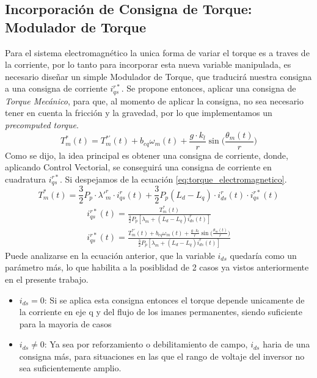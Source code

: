 \documentclass[12pt, a4paper,journal, onecolumn, compsoc]{IEEEtran}
\begin{document}
\subsection{Incorporación de Consigna de Torque: Modulador de Torque}
Para el sistema electromagnético la unica forma de variar el torque es a traves de la corriente, por lo tanto para incorporar esta nueva variable manipulada, es necesario diseñar un simple Modulador de Torque, que traducirá nuestra consigna a una consigna de corriente $i_{qs}^{r*}$. Se propone entonces, aplicar una consigna de \textit{Torque Mecánico}, para que, al momento de aplicar la consigna, no sea necesario tener en cuenta la fricción y la gravedad, por lo que implementamos un \textit{precomputed torque}.
\begin{equation}
    T_m^{\ast}(t) = T_m^{\ast\prime}(t) + b_{eq}\omega_m(t) + \frac{g\cdot k_l}{r}\sin{\Bigg( \frac{\theta_m(t)}{r}\Bigg)}
\end{equation}
Como se dijo, la idea principal es obtener una consigna de corriente, donde, aplicando Control Vectorial, se conseguirá una consigna de corriente en cuadratura $i_{qs}^{r*}$. Si despejamos de la ecuación \eqref{eq:torque_electromagnetico}.
    \begin{equation*}
            T_m^*(t) = \frac{3}{2} P_p \cdot \lambda'^r_m \cdot i^r_{qs}(t) + \frac{3}{2} P_p (L_d-L_q)\cdot i^r_{ds}(t)\cdot i^{r*}_{qs}(t)
            \label{eq:torque_electromagnetico}
    \end{equation*}
\begin{gather*}
i_{qs}^{r*}(t)=
\frac{T_m^*(t)}
{\frac{3}{2}P_p\left[\lambda_m+(L_d-L_q)i_{ds}^{r}(t)\right]} \\
i_{qs}^{r*}(t)= \frac{T_m^{\ast\prime}(t) + b_{eq}\omega_m(t) + \frac{g\cdot k_l}{r}\sin{\Big( \frac{\theta_m(t)}{r}\Big)}}{\frac{3}{2}P_p\left[\lambda_m+(L_d-L_q)i_{ds}^{r}(t)\right]}
\end{gather*}
Puede analizarse en la ecuación anterior, que la variable $i_{ds}$ quedaría como un parámetro más, lo que habilita a la posiblidad de 2 casos ya vistos anteriormente en el presente trabajo.
\begin{itemize}
    \item $i_{ds} = 0$: Si se aplica esta consigna entonces el torque depende unicamente de la corriente en eje q y del flujo de los imanes permanentes, siendo suficiente para la mayoria de casos
    \item $i_{ds} \neq 0$: Ya sea por reforzamiento o debilitamiento de campo, $i_{ds}$ haria de una consigna más, para situaciones en las que el rango de voltaje del inversor no sea suficientemente amplio.
\end{itemize}
\end{document}
